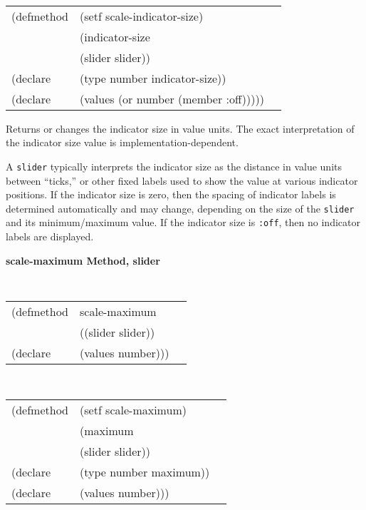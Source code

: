 \begin{flushright} \parbox[t]{6.125in}{
\tt
\begin{tabular}{lll}
\raggedright
(defmethod & (setf scale-indicator-size) & \\
         & (indicator-size \\
         & (slider  slider)) \\
(declare &(type number  indicator-size))\\
(declare & (values (or number (member :off)))))
\end{tabular}
\rm}
\end{flushright}

\begin{flushright} \parbox[t]{6.125in}{
Returns or changes the indicator size in value units. The exact interpretation
of the indicator size value is implementation-dependent.

A {\tt slider} typically interprets the indicator size as the distance in value
units between ``ticks,'' or other fixed labels used to show the value at various
indicator positions.  If the indicator size is zero, then the spacing of
indicator labels is determined automatically and may change, depending on the
size of the {\tt slider} and its minimum/maximum value.  If the indicator size
is {\tt :off}, then no indicator labels are displayed.

}
\end{flushright}



{\samepage  
{\large {\bf scale-maximum \hfill Method, slider}}
\begin{flushright} \parbox[t]{6.125in}{
\tt
\begin{tabular}{lll}
\raggedright
(defmethod & scale-maximum & \\
& ((slider  slider)) \\
(declare & (values number)))
\end{tabular}
\rm

}\end{flushright}}

\begin{flushright} \parbox[t]{6.125in}{
\tt
\begin{tabular}{lll}
\raggedright
(defmethod & (setf scale-maximum) & \\
         & (maximum \\
         & (slider  slider)) \\
(declare &(type number  maximum))\\
(declare & (values number)))
\end{tabular}
\rm}
\end{flushright}

